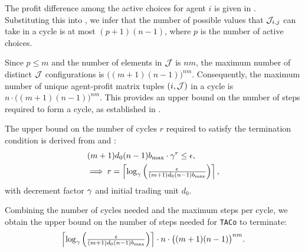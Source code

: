 \begin{customproof}
    The profit difference among the active choices for agent $i$ is given in . Substituting this into , we infer that  
    the number of possible values that $\mathcal{J}_{i,j}$ can take in a cycle is at most $(p+1)(n-1)$, where $p$ is the number of active choices.
    
    Since $p \leq m$ and the number of elements in $\mathcal{J}$ is $nm$, the maximum number of distinct $\mathcal{J}$ configurations is $\big((m+1)(n-1)\big)^{nm}$. Consequently, the maximum number of unique agent-profit matrix tuples $(i, \mathcal{J})$ in a cycle is $n \cdot \big((m+1)(n-1)\big)^{nm}$. This provides an upper bound on the number of steps required to form a cycle, as established in .

    The upper bound on the number of cycles $r$ required to satisfy the termination condition is derived from  and :
    \begin{subequations}
        \begin{align}
            &(m+1)d_0(n-1)b_{\max} \cdot \gamma^r \leq \epsilon, \\
            &\textstyle{\implies r = \left\lceil \log_{\gamma} \left(\frac{\epsilon}{(m+1)d_0(n-1)b_{\max}}\right) \right\rceil,}
        \end{align}
    \end{subequations}
    with decrement factor $\gamma$ and initial trading unit $d_0$.

    Combining the number of cycles needed and the maximum steps per cycle, we obtain the upper bound on the number of steps needed for \texttt{TACo} to terminate:
    \begin{equation}
    \textstyle{
        \left\lceil \log_{\gamma} \left(\frac{\epsilon}{(m+1)d_0(n-1)b_{\max}} \right) \right\rceil \cdot n \cdot \big((m+1)(n-1)\big)^{nm}.}
    \end{equation}
\end{customproof}


